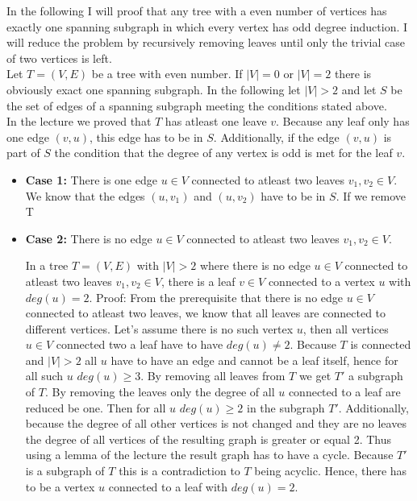 \documentclass[a4paper]{article}
\begin{document}
	\begin{solution}{6}
	In the following I will proof that any tree with a even number of vertices has exactly one spanning subgraph in which every vertex has odd degree induction. I will reduce the problem by recursively removing leaves until only the trivial case of two vertices is left. \\
	Let $T=(V, E)$ be a tree with even number. If $|V|=0$ or $|V|=2$ there is obviously exact one spanning subgraph. 
	In the following let $|V|>2$ and let $S$ be the set of edges of a spanning subgraph meeting the conditions stated above. \\
	In the lecture we proved that $T$ has atleast one leave $v$. 
	Because any leaf only has one edge $(v,u)$, this edge has to be in $S$. 
	Additionally, if the edge $(v,u)$ is part of $S$ the condition that the degree of any vertex is odd is met for the leaf $v$. 
		
	\begin{itemize}
		\item \textbf{Case 1:} There is one edge $u \in V$ connected to atleast two leaves $v_1, v_2 \in V$. \\
		We know that the edges $(u,v_1)$ and $(u,v_2)$ have to be in $S$. If we remove T
		
		\item \textbf{Case 2:} There is no edge $u \in V$ connected to atleast two leaves $v_1, v_2 \in V$. \\
		
		\begin{lemma}{In a tree $T=(V,E)$ with $|V|>2$ where there is no edge $u \in V$ connected to atleast two leaves $v_1, v_2 \in V$, there is a leaf $v \in V$ connected to a vertex $u$ with $deg(u) = 2$.}
		Proof: From the prerequisite that there is no edge $u \in V$ connected to atleast two leaves, we know that all leaves are connected to different vertices. 
		Let's assume there is no such vertex $u$, then all vertices $u \in V$ connected two a leaf have to have $deg(u) \neq 2$. 
		Because $T$ is connected and $|V|>2$ all $u$ have to have an edge and cannot be a leaf itself, hence for all such $u$ $deg(u) \geq 3$. 
		By removing all leaves from $T$ we get $T'$ a subgraph of $T$. By removing the leaves only the degree of all $u$ connected to a leaf are reduced be one. 
		Then for all $u$ $deg(u) \geq 2$ in the subgraph $T'$. 
		Additionally, because the degree of all other vertices is not changed and they are no leaves the degree of all vertices of the resulting graph is greater or equal 2. 
		Thus using a lemma of the lecture the result graph has to have a cycle. 
		Because $T'$ is a subgraph of $T$ this is a contradiction to $T$ being acyclic. 
		Hence, there has to be a vertex $u$ connected to a leaf with $deg(u)=2$. 		
		\end{lemma}
		

\end{itemize}
\end{solution}
\end{document}
